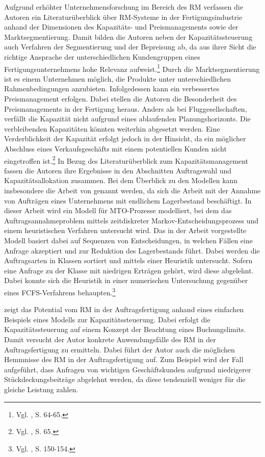 Aufgrund erhöhter Unternehmensforschung im Bereich des RM verfassen die Autoren \cite{cheraghi2010revenue} ein Literaturüberblick über RM-Systeme in der Fertigungsindustrie anhand der Dimensionen des Kapazitäts- und Preismanagements sowie der Marktsegmentierung. Damit bilden die Autoren neben der Kapazitätssteuerung auch Verfahren der Segmentierung und der Bepreisung ab, da aus ihrer Sicht die richtige Ansprache der unterschiedlichen Kundengruppen eines Fertigungsunternehmens hohe Relevanz aufweist.\footnote{Vgl. \cite{cheraghi2010revenue}, S. 64-65.} Durch die Marktsegmentierung ist es einem Unternehmen möglich, die Produkte unter unterschiedlichen Rahmenbedingungen anzubieten. Infolgedessen kann ein verbessertes Preismanagement erfolgen. Dabei stellen die Autoren die Besonderheit des Preismanagements in der Fertigung heraus. Anders als bei Fluggesellschaften, verfällt die Kapazität nicht aufgrund eines ablaufenden Planungshorizonts. Die verbleibenden Kapazitäten könnten weiterhin abgesetzt werden. Eine Verderblichkeit der Kapazität erfolgt jedoch in der Hinsicht, da ein möglicher Abschluss eines Verkaufsgeschäfts mit einem potentiellen Kunden nicht eingetroffen ist.\footnote{Vgl. \cite{cheraghi2010revenue}, S. 65.} In Bezug des Literaturüberblick zum Kapazitätsmanagement fassen die Autoren ihre Ergebnisse in den Abschnitten \glqq Auftragswahl{\grqq} und \glqq Kapazitätsallokation{\grqq} zusammen. Bei dem Überblick zu den Modellen kann insbesondere die Arbeit von \cite{Defregger:2007aa} genannt werden, da sich die Arbeit mit der Annahme von Aufträgen eines Unternehmens mit endlichem Lagerbestand beschäftigt. In dieser Arbeit wird ein Modell für MTO-Prozesse modelliert, bei dem das Auftragsannahmeproblem mittels zeitdiskreter Markov-Entscheidungsprozess und einem heuristischen Verfahren untersucht wird. Das in der Arbeit vorgestellte Modell basiert dabei auf Sequenzen von Entscheidungen, in welchen Fällen eine Anfrage akzeptiert und zur Reduktion des Lagerbestands führt. Dabei werden die Auftragsarten in Klassen sortiert und mittels einer Heuristik untersucht. Sofern eine Anfrage zu der Klasse mit niedrigen Erträgen gehört, wird diese abgelehnt. Dabei konnte sich die Heuristik in einer numerischen Untersuchung gegenüber eines FCFS-Verfahrens behaupten.\footnote{Vgl.  \cite{Defregger:2007aa}, S. 150-154.}

\cite{sucky2009revenue} zeigt das Potential vom RM in der Auftragsfertigung anhand eines einfachen Beispiels eines Modells zur Kapazitätssteuerung. Dabei erfolgt die Kapazitätssteuerung auf einem Konzept der Beachtung eines Buchungslimits. Damit versucht der Autor konkrete Anwendungsfälle des RM in der Auftragsfertigung zu ermitteln. Dabei führt der Autor auch die möglichen Hemmnisse des RM in der Auftragsfertigung auf. Zum Beispiel wird der Fall aufgeführt, dass Anfragen von wichtigen Geschäftskunden aufgrund niedrigerer Stückdeckungsbeiträge abgelehnt werden, da diese tendenziell weniger für die gleiche Leistung zahlen.
